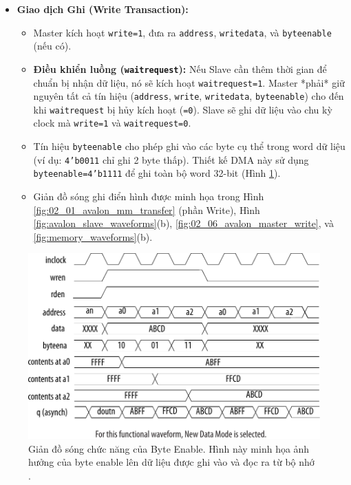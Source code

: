 \begin{itemize}
\begin{itemize}
        \end{itemize}
    \item \textbf{Giao dịch Ghi (Write Transaction):}
        \begin{itemize}
            \item Master kích hoạt \texttt{write=1}, đưa ra \texttt{address}, \texttt{writedata}, và \texttt{byteenable} (nếu có).
            \item \textbf{Điều khiển luồng (\texttt{waitrequest}):} Nếu Slave cần thêm thời gian để chuẩn bị nhận dữ liệu, nó sẽ kích hoạt \texttt{waitrequest=1}. Master *phải* giữ nguyên tất cả tín hiệu (\texttt{address}, \texttt{write}, \texttt{writedata}, \texttt{byteenable}) cho đến khi \texttt{waitrequest} bị hủy kích hoạt (\texttt{=0}). Slave sẽ ghi dữ liệu vào chu kỳ clock mà \texttt{write=1} và \texttt{waitrequest=0}.
            \item Tín hiệu \texttt{byteenable} cho phép ghi vào các byte cụ thể trong word dữ liệu (ví dụ: \texttt{4'b0011} chỉ ghi 2 byte thấp). Thiết kế DMA này sử dụng \texttt{byteenable=4'b1111} để ghi toàn bộ word 32-bit (Hình \ref{fig:02_02_memory_byteenable}).
            \item Giản đồ sóng ghi điển hình được minh họa trong Hình \ref{fig:02_01_avalon_mm_transfer} (phần Write), Hình \ref{fig:avalon_slave_waveforms}(b), \ref{fig:02_06_avalon_master_write}, và \ref{fig:memory_waveforms}(b).
        \end{itemize}
\end{itemize}

\begin{figure}[htbp]
    \centering
    \includegraphics[width=\linewidth]{Images/02_02_Memory_ByteEnable.pdf}
    \caption{Giản đồ sóng chức năng của Byte Enable. Hình này minh họa ảnh hưởng của byte enable lên dữ liệu được ghi vào và đọc ra từ bộ nhớ \cite{memory_byteenable}.}
    \label{fig:02_02_memory_byteenable} %
\end{figure}

